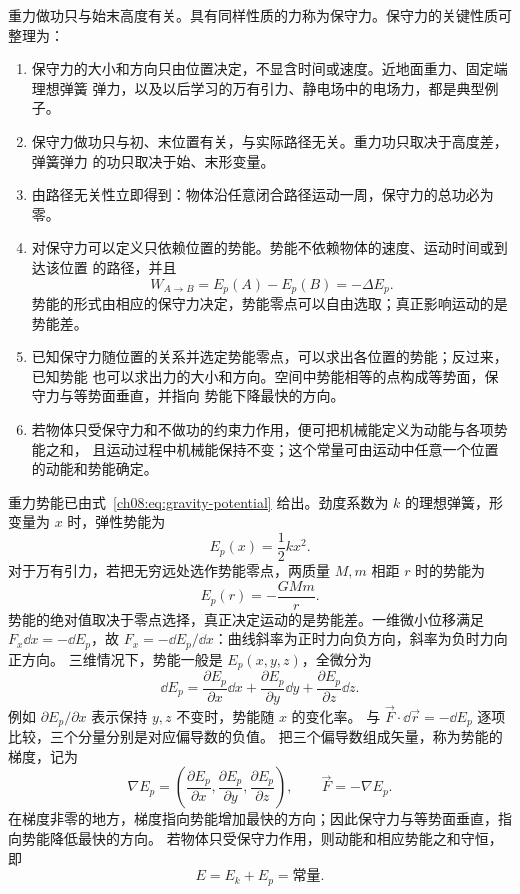 {重力做功只与始末高度有关。具有同样性质的力称为保守力。保守力的关键性质可整理为：
\begin{enumerate}[leftmargin=2.2em]
 \item 保守力的大小和方向只由位置决定，不显含时间或速度。近地面重力、固定端理想弹簧
 弹力，以及以后学习的万有引力、静电场中的电场力，都是典型例子。
 \item 保守力做功只与初、末位置有关，与实际路径无关。重力功只取决于高度差，弹簧弹力
 的功只取决于始、末形变量。
 \item 由路径无关性立即得到：物体沿任意闭合路径运动一周，保守力的总功必为零。
 \item 对保守力可以定义只依赖位置的势能。势能不依赖物体的速度、运动时间或到达该位置
 的路径，并且
 \[
 W_{A\to B}=E_p(A)-E_p(B)=-\Delta E_p.
 \]
 势能的形式由相应的保守力决定，势能零点可以自由选取；真正影响运动的是势能差。
 \item 已知保守力随位置的关系并选定势能零点，可以求出各位置的势能；反过来，已知势能
 也可以求出力的大小和方向。空间中势能相等的点构成等势面，保守力与等势面垂直，并指向
 势能下降最快的方向。
 \item 若物体只受保守力和不做功的约束力作用，便可把机械能定义为动能与各项势能之和，
 且运动过程中机械能保持不变；这个常量可由运动中任意一个位置的动能和势能确定。
\end{enumerate}
重力势能已由式~\eqref{ch08:eq:gravity-potential} 给出。劲度系数为 $k$ 的理想弹簧，形变量为 $x$ 时，弹性势能为
\begin{equation}
 E_p(x)=\frac12kx^2.
\end{equation}
对于万有引力，若把无穷远处选作势能零点，两质量 $M,m$ 相距 $r$ 时的势能为
\begin{equation}
 E_p(r)=-\frac{GMm}{r}.
\end{equation}
势能的绝对值取决于零点选择，真正决定运动的是势能差。一维微小位移满足
$F_x\dd x=-\dd E_p$，故 $F_x=-\dd E_p/\dd x$：曲线斜率为正时力向负方向，斜率为负时力向正方向。
三维情况下，势能一般是 $E_p(x,y,z)$，全微分为
\[
 \dd E_p=\frac{\partial E_p}{\partial x}\dd x+
 \frac{\partial E_p}{\partial y}\dd y+\frac{\partial E_p}{\partial z}\dd z.
\]
例如 $\partial E_p/\partial x$ 表示保持 $y,z$ 不变时，势能随 $x$ 的变化率。
与 $\vec F\cdot\dd\vec r=-\dd E_p$ 逐项比较，三个分量分别是对应偏导数的负值。
把三个偏导数组成矢量，称为势能的梯度，记为
\[
 \nabla E_p=\left(\frac{\partial E_p}{\partial x},\frac{\partial E_p}{\partial y},\frac{\partial E_p}{\partial z}\right),
 \qquad \vec F=-\nabla E_p.
\]
在梯度非零的地方，梯度指向势能增加最快的方向；因此保守力与等势面垂直，指向势能降低最快的方向。
若物体只受保守力作用，则动能和相应势能之和守恒，即
\[
 E=E_k+E_p=\text{常量}.
\]

}
